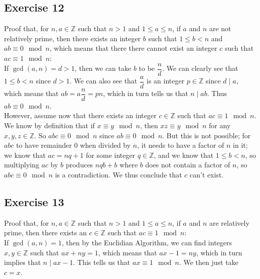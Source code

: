 \documentclass[12pt]{article}
\newcommand{\Z}{\mathbb{Z}}
\begin{document}
    \subsection*{Exercise 12}
    Proof that, for $n, a \in \Z$ such that $n > 1$
    and $1 \leqslant a \leqslant n$,
    if $a$ and $n$ are not relatively prime,
    then there exists an integer $b$ such that
    $1 \leqslant b < n$ and $ab \equiv 0 \mod n$,
    which means that there there cannot exist an integer $c$
    such that $ac \equiv 1 \mod n$: \\
    If $\gcd(a, n) = d > 1$,
    then we can take $b$ to be $\dfrac{n}{d}$.
    We can clearly see that $1 \leqslant b < n$
    since $d > 1$.
    We can also see that $\dfrac{a}{d}$ is an integer $p \in \Z$
    since $d \mid a$,
    which means that $ab = a\dfrac{n}{d} = pn$,
    which in turn tells us that $n \mid ab$.
    Thus $ab \equiv 0 \mod n$. \\
    However, assume now that there exists an integer $c \in \Z$
    such that $ac \equiv 1 \mod n$.
    We know by definition that if $x \equiv y \mod n$,
    then $xz \equiv y \mod n$ for any $x, y, z \in \Z$. 
    So $abc \equiv 0 \mod n$
    since $ab \equiv 0 \mod n$.
    But this is not possible;
    for $abc$ to have remainder $0$ when divided by $n$,
    it needs to have a factor of $n$ in it;
    we know that $ac = nq + 1$ for some integer $q \in \Z$,
    and we know that $1 \leqslant b < n$,
    so multiplying $ac$ by $b$
    produces $nqb + b$ where $b$ does not contain a factor of $n$,
    so $abc \equiv 0 \mod n$ is a contradiction.
    We thus conclude that $c$ can't exist. \\

    \subsection*{Exercise 13}
    Proof that, for $n, a \in \Z$ such that $n > 1$
    and $1 \leqslant a \leqslant n$,
    if $a$ and $n$ are relatively prime,
    then there exists an $c \in \Z$
    such that $ac \equiv 1 \mod n$: \\
    If $\gcd(a, n) = 1$,
    then by the Euclidian Algorithm, we can find integers $x, y \in \Z$
    such that $ax + ny = 1$,
    which means that $ax - 1 = ny$,
    which in turn implies that $n \mid ax - 1$.
    This tells us that $ax \equiv 1 \mod n$.
    We then just take $c = x$. \\
\end{document}
